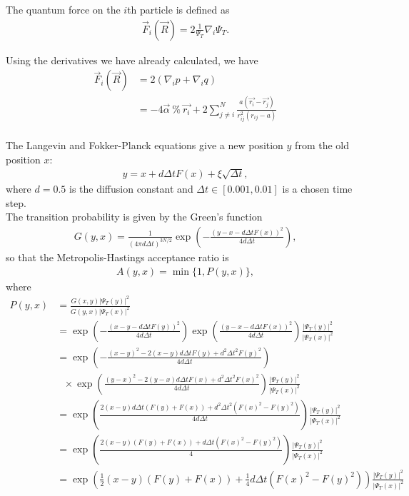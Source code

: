\documentclass[12pt]{article}
\begin{document}
The quantum force on the $i$th particle is defined as 
\begin{align}
\vec{F}_i(\vec{R}) = 2 \frac{1}{\Psi_T} \nabla_i \Psi_T.
\end{align}

Using the derivatives we have already calculated, we have
\begin{align*}
\vec{F}_i(\vec{R}) &= 2 ( \nabla_i p + \nabla_i q)\\
&= -4\vec{\alpha} \ \% \ \vec{r_i} + 2 \sum_{j\neq i}^N \frac{a(\vec{r_i}-\vec{r_j})}{r_{ij}^2(r_{ij}-a)}  \\
\end{align*}

\noindent The Langevin and Fokker-Planck equations give a new position $y$ from the old position $x$:
\begin{align}
y = x + d\Delta tF(x) + \xi \sqrt{\Delta t},
\end{align}
where $d=0.5$ is the diffusion constant and $\Delta t \in [0.001,0.01]$ is a chosen time step. \\

The transition probability is given by the Green's function
\begin{align}
G(y,x)=\frac{1}{(4\pi d \Delta t)^{3N/2}} \exp \left( -\frac{(y-x-d\Delta t F(x))^2}{4 d \Delta t} \right),
\end{align}
so that the Metropolis-Hastings acceptance ratio is
\begin{align}
A(y,x) = \min \{ 1, P(y,x) \},
\end{align}
where 
\begin{align*}
P(y,x) &= \frac{G(x,y) | \Psi_T(y) | ^2}{G(y,x) | \Psi_T(x) | ^2}\\
&= \exp \left( -\frac{(x-y-d\Delta t F(y))^2}{4 d \Delta t} \right) \exp \left( \frac{(y-x-d\Delta t F(x))^2}{4 d \Delta t} \right) \frac{| \Psi_T(y) | ^2}{ | \Psi_T(x) | ^2}\\
&= \exp \left( -\frac{(x-y)^2-2(x-y)d\Delta t F(y) + d^2 \Delta t^2 F(y)^2}{4d\Delta t} \right)\\
& \ \ \  \times \exp \left( \frac{(y-x)^2-2(y-x)d\Delta t F(x) + d^2 \Delta t^2 F(x)^2}{4d\Delta t} \right) \frac{| \Psi_T(y) | ^2}{ | \Psi_T(x) | ^2}\\
&= \exp \left( \frac{2(x-y)d\Delta t (F(y)+F(x)) + d^2 \Delta t^2 (F(x)^2-F(y)^2)}{4d\Delta t} \right) \frac{| \Psi_T(y) | ^2}{ | \Psi_T(x) | ^2}\\
&= \exp \left( \frac{2(x-y) (F(y)+F(x)) + d \Delta t (F(x)^2-F(y)^2)}{4} \right) \frac{| \Psi_T(y) | ^2}{ | \Psi_T(x) | ^2}\\
&= \exp \left( \frac{1}{2}(x-y) (F(y)+F(x)) + \frac{1}{4} d \Delta t (F(x)^2-F(y)^2) \right) \frac{| \Psi_T(y) | ^2}{ | \Psi_T(x) | ^2}\\
\end{align*}
\end{document}
